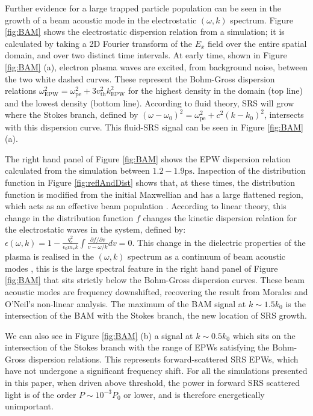 Further evidence for a large trapped particle population can be seen in the growth of a beam acoustic mode in the electrostatic $(\omega,k)$ spectrum. Figure \ref{fig:BAM} shows the electrostatic dispersion relation from a simulation; it is calculated by taking a 2D Fourier transform of the $E_x$ field over the entire spatial domain, and over two distinct time intervals. At early time, shown in Figure \ref{fig:BAM} (a), electron plasma waves are excited, from background noise, between the two white dashed curves. These
represent the Bohm-Gross dispersion relations $\omega_\mathrm{EPW}^2 = \omega_{\mathrm{pe}}^2 + 3v_\mathrm{th}^2k_\mathrm{EPW}^2$ for the highest density in the
domain (top line) and the lowest density (bottom line). According to fluid theory, SRS will grow where the  Stokes branch, defined by $(\omega-\omega_0)^2 = \omega_{\mathrm{pe}}^2 + c^2(k-k_0)^2$, intersects
with this dispersion curve. This fluid-SRS signal can be seen in Figure \ref{fig:BAM} (a).

The right hand panel of Figure \ref{fig:BAM} shows the EPW dispersion relation calculated from the simulation between $1.2 - 1.9
\si{\pico\second}$. Inspection of the distribution function in Figure \ref{fig:reflAndDist} shows that, at these times, the distribution
function is modified from the initial Maxwellian and has a large flattened region, which acts as an effective beam population
\cite{Yin2006}. According to  linear theory, this change in the distribution function $f$ changes the kinetic dispersion relation for the electrostatic waves in the system, defined by: $\epsilon(\omega,k) = 1 - \frac{q_e^2}{\epsilon_0m_ek}\int\frac{\partial{f}/\partial{v}}{v-\omega/k} dv = 0$.
This change in the dielectric properties of the plasma is realised in the $(\omega,k)$ spectrum as a continuum of beam acoustic
modes \cite{Yin2006}, this is the large spectral feature in the right hand panel of Figure \ref{fig:BAM} that sits strictly below
the Bohm-Gross dispersion curves.
These beam acoustic modes are frequency downshifted, recovering the result from Morales and O'Neil's non-linear analysis\cite{Morales1972}. The maximum of the BAM signal at $k \sim 1.5k_0$ is the intersection of the BAM with the Stokes
branch, the new location of SRS growth.

We can also see in Figure \ref{fig:BAM} (b) a signal at $k\sim 0.5k_0$ which sits on the intersection of the Stokes branch with the range of EPWs satisfying the Bohm-Gross dispersion relations. This represents forward-scattered SRS EPWs, which have not undergone a significant frequency shift. For all the simulations presented in this paper, when driven above threshold, the power in forward SRS scattered light is of the order $P \sim 10^{-3} P_0$ or lower, and is therefore energetically unimportant.


